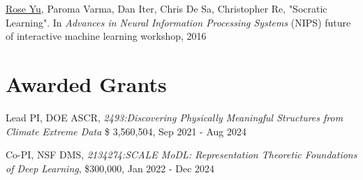 \documentclass[margin,line]{res}
\begin{document}
\begin{resume}
\begin{enumerate}[label={[W\arabic*]}]
\item \underline{Rose Yu},  Paroma Varma, Dan Iter, Chris De Sa, Christopher Re,  "Socratic Learning".  In \textit{Advances in Neural Information Processing Systems}  (NIPS) future of interactive machine learning workshop, 2016

%
%
%
\end{enumerate}


\section{\sc Awarded Grants}
\begin{enumerate}[label={[G\arabic*]}]
\item Lead PI,  DOE ASCR, \textit{2493:Discovering Physically Meaningful Structures from Climate
Extreme Data} \$ 3,560,504, Sep 2021 - Aug 2024
\item Co-PI, NSF DMS, \textit{2134274:SCALE MoDL: Representation Theoretic Foundations of Deep Learning}, \$300,000, Jan 2022 - Dec 2024


\end{enumerate}
\end{resume}
\end{document}
